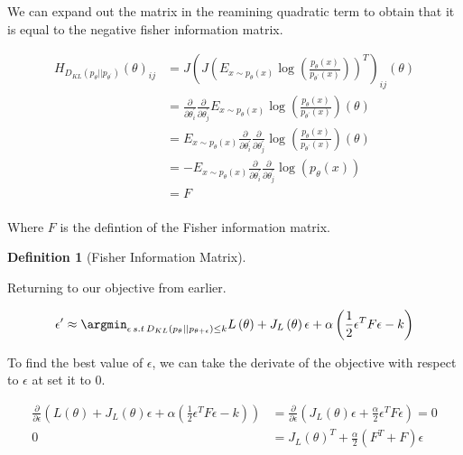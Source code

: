 \documentclass[12pt, a4paper]{report}
\theoremstyle{definition}
\newtheorem{definition}{Definition}[section]
\begin{document}
We can expand out the matrix in the reamining quadratic term to obtain that it is equal to the negative fisher information matrix.

\begin{align}
    H_{D_{KL} \left(p_\theta || p_{\theta^\prime} \right)}\left( \theta \right)_{ij} &= J \left( J \left( E_{x \sim p_\theta(x)}  \log \left( \frac{p_\theta(x)}{p_{\theta^\prime}(x)}\right)\right)^T \right)_{ij} \left( \theta \right) \\
    &= \frac{\partial}{\partial \theta^\prime_i} \frac{\partial}{\partial \theta^\prime_j} E_{x \sim p_\theta(x)}  \log \left( \frac{p_\theta(x)}{p_{\theta^\prime}(x)}\right) \left( \theta \right) \\
    &= E_{x \sim p_\theta(x)} \frac{\partial}{\partial \theta^\prime_i} \frac{\partial}{\partial \theta^\prime_j}  \log \left( \frac{p_\theta(x)}{p_{\theta^\prime}(x)}\right) \left( \theta \right) \\
    &= - E_{x \sim p_\theta(x)} \frac{\partial}{\partial \theta^\prime_i} \frac{\partial}{\partial \theta^\prime_j}  \log \left( p_{\theta}(x) \right)  \\
    &= F \\
\end{align}

Where $F$ is the defintion of the Fisher information matrix.


\begin{definition}[Fisher Information Matrix]
    
\end{definition}

Returning to our objective from earlier.

\begin{align}
    \epsilon^\prime &\approx \argmin_{\epsilon \, s.t \, D_{KL} \left(p_\theta || p_{\theta + \epsilon} \right) \leq k}  L\left( \theta \right) +  J_L \left( \theta\right) \epsilon  + \alpha \left( \frac{1}{2} \epsilon^T F \epsilon - k\right) \\
\end{align}

To find the best value of $\epsilon$, we can take the derivate of the objective with respect to $\epsilon$ at set it to $0$.


\begin{align}
   \frac{\partial}{\partial \epsilon} \left( L\left( \theta \right) + J_L \left( \theta\right) \epsilon + \alpha \left( \frac{1}{2} \epsilon^T F \epsilon - k\right) \right) &=  \frac{\partial}{\partial \epsilon} \left( J_L \left( \theta\right) \epsilon + \frac{\alpha}{2} \epsilon^T F \epsilon  \right) = 0\\
  0 &=  J_L \left( \theta\right)^T + \frac{\alpha}{2}  \left(F^T + F \right)\epsilon\\
\end{align}
\end{document}
